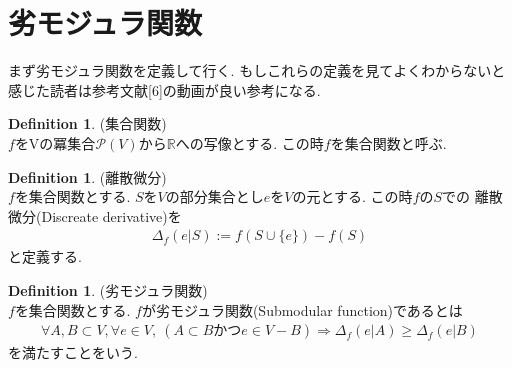 \documentclass[11pt, a4paper, dvipdfmx]{jsbook}
\theoremstyle{definition}
\newtheorem{Definition+}[Axiom+]{Definition}
\newcommand{\R}{\mathbb{R}}
\begin{document}
\section{劣モジュラ関数}
まず劣モジュラ関数を定義して行く. もしこれらの定義を見てよくわからないと感じた読者は参考文献[6]の動画が良い参考になる.
\begin{Definition+}(集合関数)\\
   $f$をVの冪集合$\mathcal{P}(V)$から$\R$への写像とする. この時$f$を集合関数と呼ぶ.
\end{Definition+}
\begin{Definition+}(離散微分)\\
    $f$を集合関数とする. $S$を$V$の部分集合とし$e$を$V$の元とする. この時$f$の$S$での
    離散微分(Discreate derivative)を
    \begin{align*}
        \Delta_{f}(e | S) := f(S\cup\{e\}) - f(S)
    \end{align*}
    と定義する.
\end{Definition+}
\begin{Definition+}(劣モジュラ関数)\\
    $f$を集合関数とする. $f$が劣モジュラ関数(Submodular function)であるとは
    \begin{align*}
        \forall A, B\subset V, \forall e\in V, ~(A\subset B かつe\in V - B)\Longrightarrow \Delta_{f}(e | A)\geq\Delta_{f}(e | B)
    \end{align*}
    を満たすことをいう.
\end{Definition+}
\end{document}
